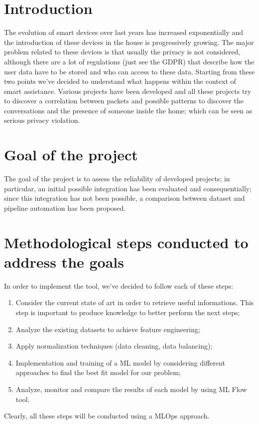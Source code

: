 \documentclass[sigconf]{acmart}
\begin{document}
    \section{Introduction}
    The evolution of smart devices over last years has increased exponentially and the introduction of these devices in the house is progressively growing.
    The major problem related to these devices is that usually the privacy is not considered, although there are a lot of regulations (just see the GDPR) that describe how the user data have to be stored and who can access to these data.
    Starting from these two points we've decided to understand what happens within the context of smart assistance.
    Various projects have been developed and all these projects try to discover a correlation between packets and possible patterns to discover the conversations and the presence of someone inside the home; which can be seen as serious privacy violation. 

\section{Goal of the project}
The goal of the project is to assess the reliability of developed projects; in particular, an initial possible integration has been evaluated and consequentially; since this integration has not been possible, a comparison between dataset and pipeline automation has been proposed. 

\section{Methodological steps conducted to address the goals}
In order to implement the tool, we've decided to follow each of these steps:
\begin{enumerate}
\item Consider the current state of art in order to retrieve useful informations. This step is important to produce knowledge to better perform the next steps;
\item Analyze the existing datasets to achieve feature engineering;
\item Apply normalization techniques (data cleaning, data balancing);
\item Implementation and training of a ML model by considering different approaches to find the best fit model for our problem;
\item Analyze, monitor and compare the results of each model by using ML Flow tool.
\end{enumerate}
Clearly, all these steps will be conducted using a MLOps approach.
\end{document}
